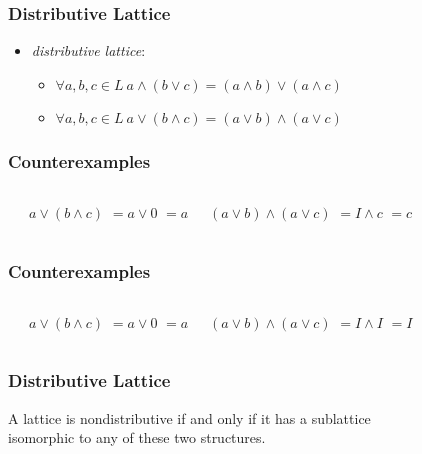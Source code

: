 \documentclass[dvipsnames]{beamer}
\begin{document}
\begin{frame}
  \frametitle{Distributive Lattice}

  \begin{itemize}
    \item \emph{distributive lattice}:
    \begin{itemize}
      \item $\forall a,b,c \in L~a \wedge (b \vee c) = (a \wedge b) \vee (a \wedge c)$
      \item $\forall a,b,c \in L~a \vee (b \wedge c) = (a \vee b) \wedge (a \vee c)$
    \end{itemize}
  \end{itemize}
\end{frame}

\begin{frame}
  \frametitle{Counterexamples}

  \begin{example}
    \begin{columns}
      \begin{center}
      \end{center}

      \pause
      $a \vee (b \wedge c)$ \pause $= a \vee 0$ \pause $= a$

      \pause
      $(a \vee b) \wedge (a \vee c)$ \pause $= I \wedge c$ \pause $= c$
    \end{columns}
  \end{example}
\end{frame}

\begin{frame}
  \frametitle{Counterexamples}

  \begin{example}
    \begin{columns}
      \begin{center}
      \end{center}

      \pause
      $a \vee (b \wedge c)$ \pause $= a \vee 0$ \pause $= a$

      \pause
      $(a \vee b) \wedge (a \vee c)$ \pause $= I \wedge I$ \pause $= I$
    \end{columns}
  \end{example}
\end{frame}

\begin{frame}
  \frametitle{Distributive Lattice}

  \begin{theorem}
    A lattice is nondistributive if and only if it has a sublattice\\
    isomorphic to any of these two structures.
  \end{theorem}
\end{frame}
\end{document}
